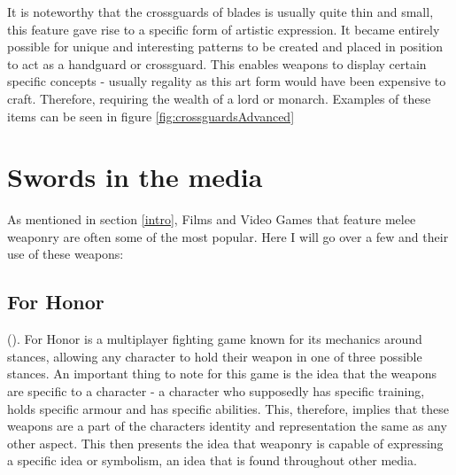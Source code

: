 \documentclass{article}
\begin{document}
It is noteworthy that the crossguards of blades is usually quite thin and small, this feature gave rise to a specific form of artistic expression. It became entirely possible for unique and interesting patterns to be created and placed in position to act as a handguard or crossguard. This enables weapons to display certain specific concepts - usually regality as this art form would have been expensive to craft. Therefore, requiring the wealth of a lord or monarch. Examples of these items can be seen in figure \ref{fig:crossguardsAdvanced}

\pagebreak

\section{Swords in the media} \label{media}
As mentioned in section \ref{intro}, Films and Video Games that feature melee weaponry are often some of the most popular. Here I will go over a few and their use of these weapons:

\subsection{For Honor}
().
For Honor is a multiplayer fighting game known for its mechanics around stances, allowing any character to hold their weapon in one of three possible stances. An important thing to note for this game is the idea that the weapons are specific to a character - a character who supposedly has specific training, holds specific armour and has specific abilities. This, therefore, implies that these weapons are a part of the characters identity and representation the same as any other aspect. This then presents the idea that weaponry is capable of expressing a specific idea or symbolism, an idea that is found throughout other media.
\end{document}

